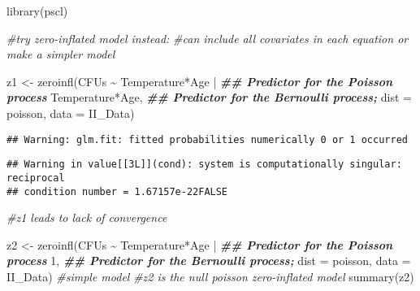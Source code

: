\documentclass[
]{article}
\newenvironment{Shaded}{\begin{snugshade}}{\end{snugshade}}
\newcommand{\AttributeTok}[1]{\textcolor[rgb]{0.77,0.63,0.00}{#1}}
\newcommand{\CommentTok}[1]{\textcolor[rgb]{0.56,0.35,0.01}{\textit{#1}}}
\newcommand{\DecValTok}[1]{\textcolor[rgb]{0.00,0.00,0.81}{#1}}
\newcommand{\DocumentationTok}[1]{\textcolor[rgb]{0.56,0.35,0.01}{\textbf{\textit{#1}}}}
\newcommand{\FunctionTok}[1]{\textcolor[rgb]{0.00,0.00,0.00}{#1}}
\newcommand{\NormalTok}[1]{#1}
\newcommand{\OtherTok}[1]{\textcolor[rgb]{0.56,0.35,0.01}{#1}}
\newcommand{\SpecialCharTok}[1]{\textcolor[rgb]{0.00,0.00,0.00}{#1}}
\newcommand{\StringTok}[1]{\textcolor[rgb]{0.31,0.60,0.02}{#1}}
\begin{document}
\begin{Shaded}
\begin{Highlighting}[]
\FunctionTok{library}\NormalTok{(pscl)}

\CommentTok{\#try zero{-}inflated model instead: }
\CommentTok{\#can include all covariates in each equation or make a simpler model}

\NormalTok{z1 }\OtherTok{\textless{}{-}} \FunctionTok{zeroinfl}\NormalTok{(CFUs }\SpecialCharTok{\textasciitilde{}}\NormalTok{ Temperature}\SpecialCharTok{*}\NormalTok{Age }\SpecialCharTok{|} \DocumentationTok{\#\# Predictor for the Poisson process}
\NormalTok{                 Temperature}\SpecialCharTok{*}\NormalTok{Age, }\DocumentationTok{\#\# Predictor for the Bernoulli process;}
               \AttributeTok{dist =} \StringTok{\textquotesingle{}poisson\textquotesingle{}}\NormalTok{,}
               \AttributeTok{data =}\NormalTok{ II\_Data)}
\end{Highlighting}
\end{Shaded}

\begin{verbatim}
## Warning: glm.fit: fitted probabilities numerically 0 or 1 occurred
\end{verbatim}

\begin{verbatim}
## Warning in value[[3L]](cond): system is computationally singular: reciprocal
## condition number = 1.67157e-22FALSE
\end{verbatim}

\begin{Shaded}
\begin{Highlighting}[]
\CommentTok{\#z1 leads to lack of convergence}

\NormalTok{z2 }\OtherTok{\textless{}{-}} \FunctionTok{zeroinfl}\NormalTok{(CFUs }\SpecialCharTok{\textasciitilde{}}\NormalTok{ Temperature}\SpecialCharTok{*}\NormalTok{Age }\SpecialCharTok{|} \DocumentationTok{\#\# Predictor for the Poisson process}
                 \DecValTok{1}\NormalTok{, }\DocumentationTok{\#\# Predictor for the Bernoulli process;}
               \AttributeTok{dist =} \StringTok{\textquotesingle{}poisson\textquotesingle{}}\NormalTok{,}
               \AttributeTok{data =}\NormalTok{ II\_Data) }\CommentTok{\#simple model}
\CommentTok{\#z2 is the null poisson zero{-}inflated model}
\FunctionTok{summary}\NormalTok{(z2)}
\end{Highlighting}
\end{Shaded}
\end{document}
